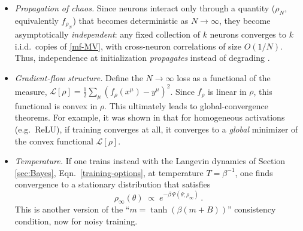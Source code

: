 \documentclass[11pt]{article}
\newcommand{\CL}{{\mathcal L}}
\begin{document}
\begin{itemize}
    \item \emph{Propagation of chaos.} Since neurons interact only through a quantity ($\rho_N$, equivalently $f_{\rho_N}$) that becomes deterministic as $N\to\infty$, they become asymptotically \emph{independent}: any fixed collection of $k$ neurons converges to $k$ i.i.d.\ copies of \eqref{mf-MV}, with cross-neuron correlations of size $O(1/N)$. Thus, independence at initialization \emph{propagates} instead of degrading \cite{sznitman1991topics}. %
    \item \emph{Gradient-flow structure.} Define the $N\to\infty$ loss as a functional of the measure, $\CL[\rho] = \frac{1}{2}\sum_\mu (f_\rho(x^\mu)-y^\mu)^2$. Since $f_\rho$ is linear in $\rho$, this functional is convex in $\rho$. %
    This ultimately leads to global-convergence theorems. For example, it was shown in \cite{chizat2018global} that for homogeneous activations (e.g.\ ReLU), if training converges at all, it converges to a \emph{global} minimizer of the convex functional $\CL[\rho]$.
    \item \emph{Temperature.} If one trains instead with the Langevin dynamics of Section \ref{sec:Bayes}, Eqn.~\eqref{training-options}, at temperature $T=\beta^{-1}$, one finds convergence to a stationary distribution that satisfies \cite{mei2018mean}
    \begin{equation} \label{mf-gibbs}
        \rho_\infty(\theta) \;\propto\; e^{\textstyle-\beta\,\Psi(\theta;\rho_\infty)}\,.
    \end{equation}
    This is another version of the ``$m=\tanh(\beta(m+B))$'' consistency condition, now for noisy training.
\end{itemize}
\end{document}
